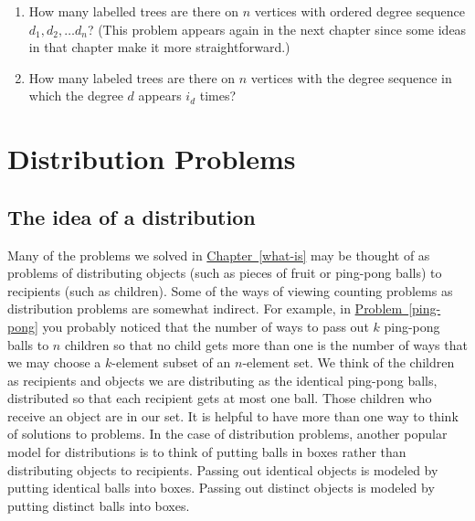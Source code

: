 \documentclass[10pt,]{book}
\theoremstyle{plain}
\theoremstyle{definition}
\theoremstyle{definition}
\numberwithin{equation}{chapter}
\begin{document}
\begin{exerciselist}
\begin{enumerate}[label=(\alph*)]
\item\hypertarget{li-37}{}How many labelled trees are there on \(n\) vertices with ordered degree sequence \(d_1,d_2,\ldots d_n\)? (This problem appears again in the next chapter since some ideas in that chapter make it more straightforward.)%
\item\hypertarget{li-38}{}How many labeled trees are there on \(n\) vertices with the degree sequence in which the degree \(d\) appears \(i_d\) times?%
\end{enumerate}
%
\par\smallskip
\end{exerciselist}
\typeout{************************************************}
\typeout{************************************************}
\chapter[{Distribution Problems}]{Distribution Problems}\label{ch3-distribution}
\typeout{************************************************}
\typeout{************************************************}
\section[{The idea of a distribution}]{The idea of a distribution}\label{s3-1-distrib-idea}
\hypertarget{p-719}{}%
Many of the problems we solved in \hyperref[what-is]{Chapter~\ref{what-is}} may be thought of as problems of distributing objects (such as pieces of fruit or ping-pong balls) to recipients (such as children). Some of the ways of viewing counting problems as distribution problems are somewhat indirect. For example, in \hyperref[ping-pong]{Problem~\ref{ping-pong}} you probably noticed that the number of ways to pass out \(k\) ping-pong balls to \(n\) children so that no child gets more than one is the number of ways that we may choose a \(k\)-element subset of an \(n\)-element set. We think of the children as recipients and objects we are distributing as the identical ping-pong balls, distributed so that each recipient gets at most one ball. Those children who receive an object are in our set. It is helpful to have more than one way to think of solutions to problems. In the case of distribution problems, another popular model for distributions is to think of putting balls in boxes rather than distributing objects to recipients. Passing out identical objects is modeled by putting identical balls into boxes. Passing out distinct objects is modeled by putting distinct balls into boxes.%
\typeout{************************************************}
\typeout{************************************************}
\end{document}
